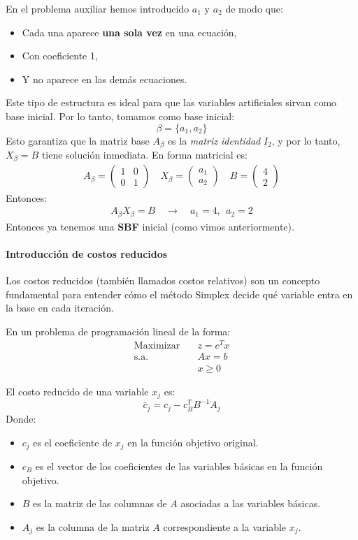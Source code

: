 En el problema auxiliar hemos introducido \(a_1\) y \(a_2\) de modo que:
\begin{itemize}
  \item Cada una aparece \textbf{una sola vez} en una ecuación,
  \item Con coeficiente 1,
  \item Y no aparece en las demás ecuaciones.
\end{itemize}
Este tipo de estructura es ideal para que las variables artificiales sirvan como base inicial. Por lo tanto, tomamos como base inicial:
\[
  \beta = \{a_1, a_2\}
\]
Esto garantiza que la matriz base \(A_\beta\) es la \textit{matriz identidad} \(I_2\), y por lo tanto, \(X_\beta = B\) tiene solución inmediata. En forma matricial es:
\begin{align*}
  A_\beta =
  \begin{pmatrix}
    1 & 0\\
    0 & 1
  \end{pmatrix}
  \quad
  X_\beta =
  \begin{pmatrix}
    a_1\\
    a_2
  \end{pmatrix}
  \quad
  B =
  \begin{pmatrix}
    4\\
    2
  \end{pmatrix}
\end{align*}
Entonces:
\begin{align*}
  A_\beta X_\beta = B \quad \rightarrow \quad {a_1} = 4, ~~ {a_2} = 2
\end{align*}
Entonces ya tenemos una \textbf{SBF} inicial (como vimos anteriormente).

\paragraph{Introducción de costos reducidos}

Los costos reducidos (también llamados costos relativos) son un concepto fundamental para entender cómo el método Simplex decide qué variable entra en la base en cada iteración.

En un problema de programación lineal de la forma:
\begin{align*}
\text{Maximizar} \quad & z = c^T x \\
\text{s.a.} \quad & Ax = b \\
& x \geq 0
\end{align*}

El costo reducido de una variable \(x_j\) es:
\[
\bar{c}_j = c_j - c_B^T B^{-1} A_j
\]
Donde:
\begin{itemize}
  \item \(c_j\) es el coeficiente de \(x_j\) en la función objetivo original.
  \item \(c_B\) es el vector de los coeficientes de las variables básicas en la función objetivo.
  \item \(B\) es la matriz de las columnas de \(A\) asociadas a las variables básicas.
  \item \(A_j\) es la columna de la matriz \(A\) correspondiente a la variable \(x_j\).
\end{itemize}

